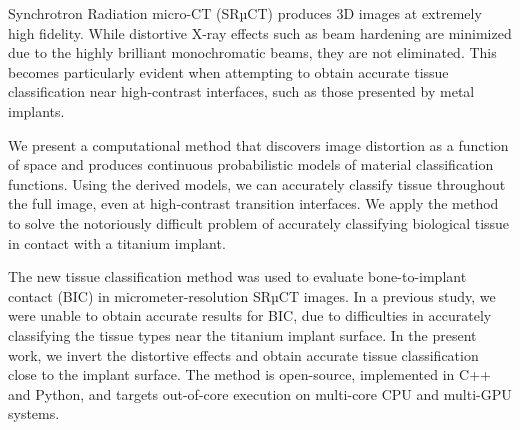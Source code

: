 Synchrotron Radiation micro-CT (SRµCT) produces 3D images at extremely high
fidelity. While distortive X-ray effects such as beam hardening are minimized
due to the highly brilliant monochromatic beams, they are not eliminated. This
becomes particularly evident when attempting to obtain accurate tissue
classification near high-contrast interfaces, such as those presented by metal
implants.

We present a computational method that discovers image distortion as a function
of space and produces continuous probabilistic models of material
classification functions. Using the derived models, we can accurately classify
tissue throughout the full image, even at high-contrast transition interfaces.
We apply the method to solve the notoriously difficult problem of accurately
classifying biological tissue in contact with a titanium implant.

The new tissue classification method was used to evaluate bone-to-implant
contact (BIC) in micrometer-resolution SRµCT images. In a previous study, we
were unable to obtain accurate results for BIC, due to difficulties in
accurately classifying the tissue types near the titanium implant surface. In
the present work, we invert the distortive effects and obtain accurate tissue
classification close to the implant surface.
The method is open-source, implemented in C++ and Python, and targets
out-of-core execution on multi-core CPU and multi-GPU systems.

